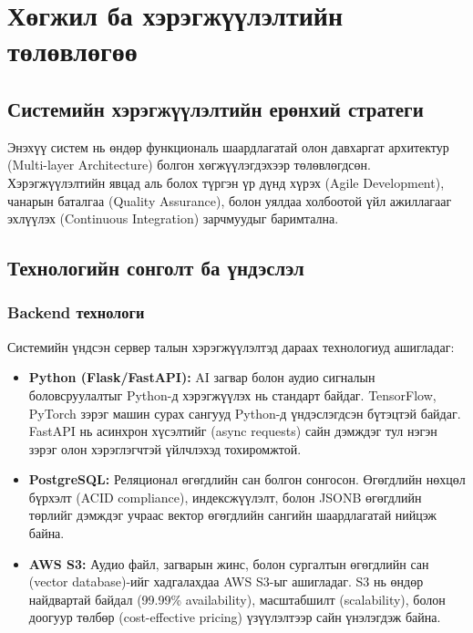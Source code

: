 
\chapter{Хөгжил ба хэрэгжүүлэлтийн төлөвлөгөө}
\label{Chapter4}

\section{Системийн хэрэгжүүлэлтийн ерөнхий стратеги}

Энэхүү систем нь өндөр функциональ шаардлагатай олон давхаргат архитектур (Multi-layer Architecture) болгон хөгжүүлэгдэхээр төлөвлөгдсөн. Хэрэгжүүлэлтийн явцад аль болох түргэн үр дүнд хүрэх (Agile Development), чанарын баталгаа (Quality Assurance), болон уялдаа холбоотой үйл ажиллагааг эхлүүлэх (Continuous Integration) зарчмуудыг баримтална.

\section{Технологийн сонголт ба үндэслэл}

\subsection{Backend технологи}

Системийн үндсэн сервер талын хэрэгжүүлэлтэд дараах технологиуд ашигладаг:

\begin{itemize}
    \item \textbf{Python (Flask/FastAPI):} AI загвар болон аудио сигналын боловсруулалтыг Python-д хэрэгжүүлэх нь стандарт байдаг. TensorFlow, PyTorch зэрэг машин сурах сангууд Python-д үндэслэгдсэн бүтэцтэй байдаг. FastAPI нь асинхрон хүсэлтийг (async requests) сайн дэмждэг тул нэгэн зэрэг олон хэрэглэгчтэй үйлчлэхэд тохиромжтой.
    
    \item \textbf{PostgreSQL:} Реляционал өгөгдлийн сан болгон сонгосон. Өгөгдлийн нөхцөл бүрхэлт (ACID compliance), индексжүүлэлт, болон JSONB өгөгдлийн төрлийг дэмждэг учраас вектор өгөгдлийн сангийн шаардлагатай нийцэж байна.
    
    \item \textbf{AWS S3:} Аудио файл, загварын жинс, болон сургалтын өгөгдлийн сан (vector database)-ийг хадгалахдаа AWS S3-ыг ашигладаг. S3 нь өндөр найдвартай байдал (99.99\% availability), масштабшилт (scalability), болон доогуур төлбөр (cost-effective pricing) үзүүлэлтээр сайн үнэлэгдэж байна.
\end{itemize}

